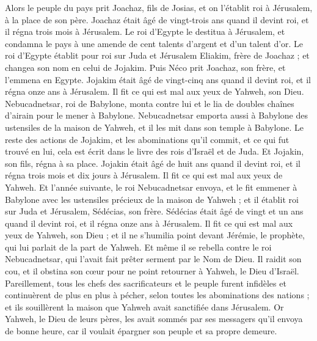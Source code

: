 \begin{multicols}{2}
\VerseOne{}Alors le peuple du pays prit Joachaz, fils de Josias, et on l'établit roi à Jérusalem, à la place de son père.
Joachaz était âgé de vingt-trois ans quand il devint roi, et il régna trois mois à Jérusalem.
Le roi d'Egypte le destitua à Jérusalem, et condamna le pays à une amende de cent talents d'argent et d'un talent d'or.
Le roi d'Egypte établit pour roi sur Juda et Jérusalem Eliakim, frère de Joachaz ; et changea son nom en celui de Jojakim. Puis Néco prit Joachaz, son frère, et l'emmena en Egypte.
Jojakim était âgé de vingt-cinq ans quand il devint roi, et il régna onze ans à Jérusalem. Il fit ce qui est mal aux yeux de Yahweh, son Dieu.
Nebucadnetsar, roi de Babylone, monta contre lui et le lia de doubles chaînes d'airain pour le mener à Babylone.
Nebucadnetsar emporta aussi à Babylone des ustensiles de la maison de Yahweh, et il les mit dans son temple à Babylone.
Le reste des actions de Jojakim, et les abominations qu'il commit, et ce qui fut trouvé en lui, cela est écrit dans le livre des rois d'Israël et de Juda. Et Jojakin, son fils, régna à sa place.
Jojakin était âgé de huit ans quand il devint roi, et il régna trois mois et dix jours à Jérusalem. Il fit ce qui est mal aux yeux de Yahweh.
Et l'année suivante, le roi Nebucadnetsar envoya, et le fit emmener à Babylone avec les ustensiles précieux de la maison de Yahweh ; et il établit roi sur Juda et Jérusalem, Sédécias, son frère.
Sédécias était âgé de vingt et un ans quand il devint roi, et il régna onze ans à Jérusalem.
Il fit ce qui est mal aux yeux de Yahweh, son Dieu ; et il ne s'humilia point devant Jérémie, le prophète, qui lui parlait de la part de Yahweh.
Et même il se rebella contre le roi Nebucadnetsar, qui l'avait fait prêter serment par le Nom de Dieu. Il raidit son cou, et il obstina son cœur pour ne point retourner à Yahweh, le Dieu d'Israël.
Pareillement, tous les chefs des sacrificateurs et le peuple furent infidèles et continuèrent de plus en plus à pécher, selon toutes les abominations des nations ; et ils souillèrent la maison que Yahweh avait sanctifiée dans Jérusalem.
Or Yahweh, le Dieu de leurs pères, les avait sommés par ses messagers qu'il envoya de bonne heure, car il voulait épargner son peuple et sa propre demeure.

\end{multicols}
